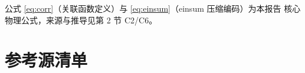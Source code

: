 \documentclass[UTF8]{ctexart}
\begin{document}














公式 \eqref{eq:corr}（关联函数定义）与 \eqref{eq:einsum}（einsum 压缩编码）为本报告
核心物理公式，来源与推导见第 2 节 C2/C6。

\section{参考源清单}
\end{document}
